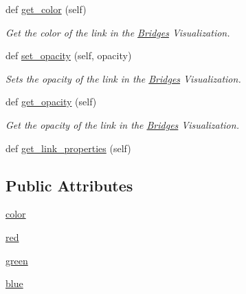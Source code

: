 \begin{DoxyCompactItemize}
def \mbox{\hyperlink{class_bridges_1_1_link_visualizer_1_1_link_visualizer_ac8856286df8b7bbbf36a6d97e0ee7c0a}{get\+\_\+color}} (self)
\begin{DoxyCompactList}\small\item\em Get the color of the link in the \mbox{\hyperlink{namespace_bridges_1_1_bridges}{Bridges}} Visualization. \end{DoxyCompactList}\item 
def \mbox{\hyperlink{class_bridges_1_1_link_visualizer_1_1_link_visualizer_a44411f855d60c20b267f1178add887bb}{set\+\_\+opacity}} (self, opacity)
\begin{DoxyCompactList}\small\item\em Sets the opacity of the link in the \mbox{\hyperlink{namespace_bridges_1_1_bridges}{Bridges}} Visualization. \end{DoxyCompactList}\item 
def \mbox{\hyperlink{class_bridges_1_1_link_visualizer_1_1_link_visualizer_a87be28711f26ade5bc0125d316bf1705}{get\+\_\+opacity}} (self)
\begin{DoxyCompactList}\small\item\em Get the opacity of the link in the \mbox{\hyperlink{namespace_bridges_1_1_bridges}{Bridges}} Visualization. \end{DoxyCompactList}\item 
def \mbox{\hyperlink{class_bridges_1_1_link_visualizer_1_1_link_visualizer_aa2d8f801447cbb9681a1312300e7980a}{get\+\_\+link\+\_\+properties}} (self)
\end{DoxyCompactItemize}
\subsection*{Public Attributes}
\begin{DoxyCompactItemize}
\item 
\mbox{\hyperlink{class_bridges_1_1_link_visualizer_1_1_link_visualizer_ad399e71444ce7ddd0909449c12b579bf}{color}}
\item 
\mbox{\hyperlink{class_bridges_1_1_link_visualizer_1_1_link_visualizer_a35b9ab7e92a3af0908966ca3b9fa2772}{red}}
\item 
\mbox{\hyperlink{class_bridges_1_1_link_visualizer_1_1_link_visualizer_a5cb6282f83a49fb9a128d5389fc4cecd}{green}}
\item 
\mbox{\hyperlink{class_bridges_1_1_link_visualizer_1_1_link_visualizer_a73ecbf45d989c54a89106ddf30ecb765}{blue}}
\end{DoxyCompactItemize}
